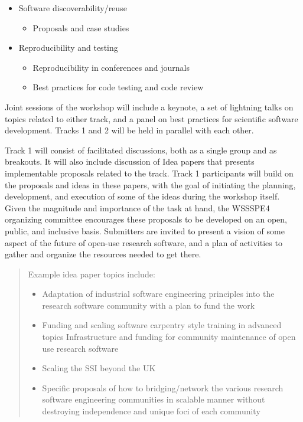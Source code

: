 \documentclass[11pt]{article}
\newenvironment{shortlist}{
        \vspace*{-0.8em}
  \begin{itemize}
  \setlength{\itemsep}{-0.3em}
}{
  \end{itemize}
        \vspace*{-0.6em}
}
\begin{document}
\begin{shortlist}
\begin{shortlist}
\item Journals and alternative venues for publishing software
\item Review processes for published software
\end{shortlist}
\item Software discoverability/reuse
\begin{shortlist}
\item Proposals and case studies
\end{shortlist}
\item Reproducibility and testing
\begin{shortlist}
\item Reproducibility in conferences and journals
\item Best practices for code testing and code review
\end{shortlist}
\end{shortlist}


Joint sessions of the workshop will include a keynote, a set of lightning talks on topics related to either track, and a panel on best practices for scientific software development.  Tracks 1 and 2 will be held in parallel with each other.

Track 1 will consist of facilitated discussions, both as a single group and as breakouts.  It will also include discussion of Idea papers that presents implementable proposals related to the track.
Track 1 participants will build on the proposals and ideas in these papers, with the goal of initiating the planning, development, and execution of some of the ideas during the workshop itself. Given the magnitude and importance of the task at hand, the WSSSPE4 organizing committee encourages these proposals to be developed on an open, public, and inclusive basis. Submitters are invited to present a vision of some aspect of the future of open-use research software, and a plan of activities to gather and organize the resources needed to get there.

\begin{quote}
Example idea paper topics include:
\begin{shortlist}
\item Adaptation of industrial software engineering principles into the research software community with a plan to fund the work
\item Funding and scaling software carpentry style training in advanced topics
Infrastructure and funding for community maintenance of open use research software
\item Scaling the SSI beyond the UK
\item Specific proposals of how to bridging/network the various research software engineering communities in scalable manner without destroying independence and unique foci of each community
\end{shortlist}
\end{quote}
\end{document}
